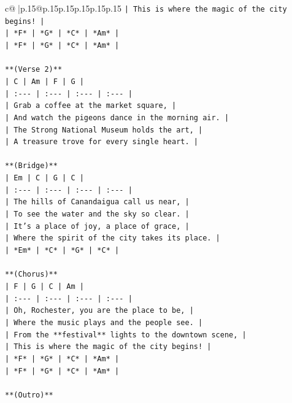 \documentclass{article}
\begin{document}
{\begin{supertabular}{c@{$\;$}|p{.15\linewidth}@{}p{.15\linewidth}p{.15\linewidth}p{.15\linewidth}p{.15\linewidth}p{.15\linewidth}}
{{{\texttt{| This is where the magic of the city begins! |} \\
\texttt{| *F* | *G* | *C* | *Am* |} \\
\texttt{| *F* | *G* | *C* | *Am* |} \\
\\ 
\texttt{**(Verse 2)**} \\
\texttt{| C | Am | F | G |} \\
\texttt{| :{-}{-}{-} | :{-}{-}{-} | :{-}{-}{-} | :{-}{-}{-} |} \\
\texttt{| Grab a coffee at the market square, |} \\
\texttt{| And watch the pigeons dance in the morning air. |} \\
\texttt{| The Strong National Museum holds the art, |} \\
\texttt{| A treasure trove for every single heart. |} \\
\\ 
\texttt{**(Bridge)**} \\
\texttt{| Em | C | G | C |} \\
\texttt{| :{-}{-}{-} | :{-}{-}{-} | :{-}{-}{-} | :{-}{-}{-} |} \\
\texttt{| The hills of Canandaigua call us near, |} \\
\texttt{| To see the water and the sky so clear. |} \\
\texttt{| It's a place of joy, a place of grace, |} \\
\texttt{| Where the spirit of the city takes its place. |} \\
\texttt{| *Em* | *C* | *G* | *C* |} \\
\\ 
\texttt{**(Chorus)**} \\
\texttt{| F | G | C | Am |} \\
\texttt{| :{-}{-}{-} | :{-}{-}{-} | :{-}{-}{-} | :{-}{-}{-} |} \\
\texttt{| Oh, Rochester, you are the place to be, |} \\
\texttt{| Where the music plays and the people see. |} \\
\texttt{| From the **festival** lights to the downtown scene, |} \\
\texttt{| This is where the magic of the city begins! |} \\
\texttt{| *F* | *G* | *C* | *Am* |} \\
\texttt{| *F* | *G* | *C* | *Am* |} \\
\\ 
\texttt{**(Outro)**} \\
}}}
\end{supertabular}}
\end{document}
